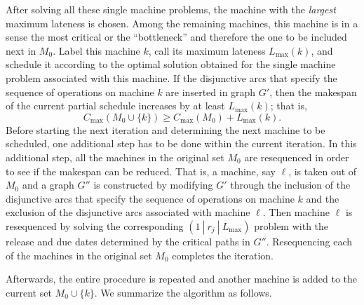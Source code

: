After solving all these single machine problems, the machine with the 
\emph{largest} maximum lateness is chosen. Among the remaining machines, 
this machine is in a sense the most critical or the ``bottleneck'' and therefore 
the one to be included next in $M_0$. Label this machine $k$, call its 
maximum lateness $L_{\max}(k)$, and schedule it according to the optimal 
solution obtained for the single machine problem associated with this 
machine. If the disjunctive arcs that specify the sequence of operations on 
machine $k$ are inserted in graph $G'$, then the makespan
of the current partial schedule increases by at least $L_{\max}(k)$; that is,
\[ C_{\max}(M_0 \cup \{k\}) \geq C_{\max}(M_0) + L_{\max}(k). \] 
Before starting the next iteration and determining the next machine to be
scheduled, one additional step has to be done within the current iteration. In
this additional step, all the machines in the original set $M_0$ are 
resequenced in order to see if the makespan can be reduced. That is, 
a machine, say $\ell$, is taken out of $M_0$ and a graph $G''$ is 
constructed by modifying $G'$ through the inclusion of the disjunctive arcs 
that specify the sequence of operations on machine $k$ and the exclusion 
of the disjunctive arcs associated with machine $\ell$. Then machine $\ell$ 
is resequenced by solving the corresponding $(1~|~r_j~|~L_{\max})$ 
problem with the release and due dates determined by the critical paths in 
$G''$. Resequencing each of the machines in the original set $M_0$ completes 
the iteration. 

Afterwards, the entire procedure is repeated and another machine is added 
to the current set $M_0 \cup \{k\}$. We summarize the algorithm as follows. 

